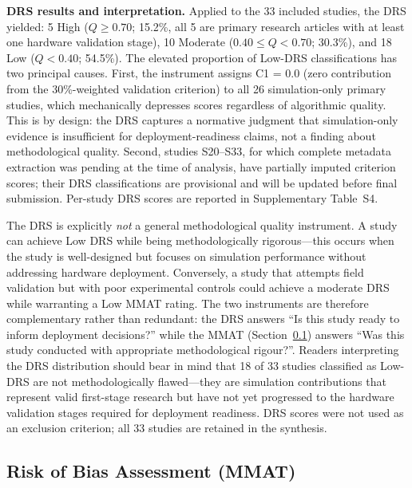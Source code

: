 \documentclass[review,3p,times]{elsarticle}
\begin{document}
\textbf{DRS results and interpretation.} Applied to the 33 included studies, the DRS yielded: 5 High ($Q \geq 0.70$; 15.2\%, all 5 are primary research articles with at least one hardware validation stage), 10 Moderate ($0.40 \leq Q < 0.70$; 30.3\%), and 18 Low ($Q < 0.40$; 54.5\%). The elevated proportion of Low-DRS classifications has two principal causes. First, the instrument assigns C1 = 0.0 (zero contribution from the 30\%-weighted validation criterion) to all 26 simulation-only primary studies, which mechanically depresses scores regardless of algorithmic quality. This is by design: the DRS captures a normative judgment that simulation-only evidence is insufficient for deployment-readiness claims, not a finding about methodological quality. Second, studies S20--S33, for which complete metadata extraction was pending at the time of analysis, have partially imputed criterion scores; their DRS classifications are provisional and will be updated before final submission. Per-study DRS scores are reported in Supplementary Table~S4.

The DRS is explicitly \textit{not} a general methodological quality instrument. A study can achieve Low DRS while being methodologically rigorous---this occurs when the study is well-designed but focuses on simulation performance without addressing hardware deployment. Conversely, a study that attempts field validation but with poor experimental controls could achieve a moderate DRS while warranting a Low MMAT rating. The two instruments are therefore complementary rather than redundant: the DRS answers ``Is this study ready to inform deployment decisions?'' while the MMAT (Section~\ref{subsec:mmat}) answers ``Was this study conducted with appropriate methodological rigour?''. Readers interpreting the DRS distribution should bear in mind that 18 of 33 studies classified as Low-DRS are not methodologically flawed---they are simulation contributions that represent valid first-stage research but have not yet progressed to the hardware validation stages required for deployment readiness. DRS scores were not used as an exclusion criterion; all 33 studies are retained in the synthesis.

\subsection{Risk of Bias Assessment (MMAT)}
\label{subsec:mmat}
\end{document}
